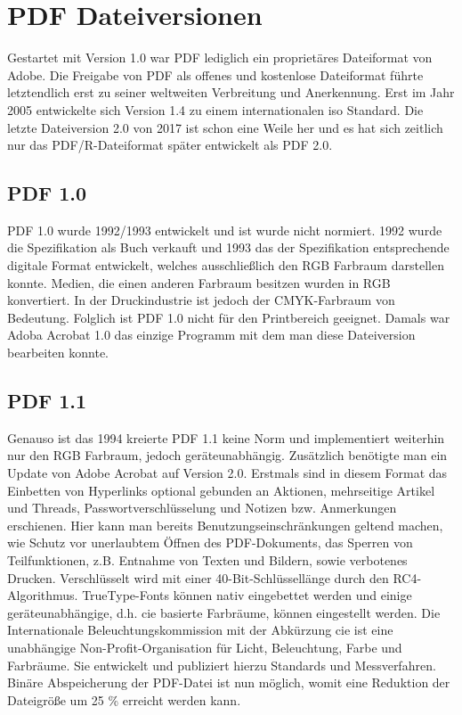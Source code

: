 \section{PDF Dateiversionen}
Gestartet mit Version 1.0 war PDF lediglich ein proprietäres Dateiformat von Adobe. Die Freigabe von PDF als offenes und kostenlose Dateiformat führte letztendlich erst zu seiner weltweiten Verbreitung und Anerkennung. Erst im Jahr 2005 entwickelte sich Version 1.4 zu einem internationalen \gls{iso} Standard. Die letzte Dateiversion 2.0 von 2017 ist schon eine Weile her und es hat sich zeitlich nur das PDF/R-Dateiformat später entwickelt als PDF 2.0.

\subsection{PDF 1.0}
PDF 1.0 wurde 1992/1993 entwickelt und ist wurde nicht normiert. 1992 wurde die Spezifikation als Buch verkauft und 1993 das der Spezifikation entsprechende digitale Format entwickelt, welches ausschließlich den RGB Farbraum darstellen konnte. Medien, die einen anderen Farbraum besitzen wurden in RGB konvertiert. In der Druckindustrie ist jedoch der CMYK-Farbraum von Bedeutung. Folglich ist PDF 1.0 nicht für den Printbereich geeignet. Damals war Adoba Acrobat 1.0 das einzige Programm mit dem man diese Dateiversion bearbeiten konnte. \cite{proj-consult}

\subsection{PDF 1.1}
Genauso ist das 1994 kreierte PDF 1.1 keine Norm und implementiert weiterhin nur den RGB Farbraum, jedoch geräteunabhängig. Zusätzlich benötigte man ein Update von Adobe Acrobat auf Version 2.0. Erstmals sind in diesem Format das Einbetten von Hyperlinks optional gebunden an Aktionen, mehrseitige Artikel und Threads, Passwortverschlüsselung und Notizen bzw. Anmerkungen erschienen. \cite{proj-consult} Hier kann man bereits Benutzungseinschränkungen geltend machen, wie Schutz vor unerlaubtem Öffnen des PDF-Dokuments, das Sperren von Teilfunktionen, z.B. Entnahme von Texten und Bildern, sowie verbotenes Drucken. Verschlüsselt wird mit einer 40-Bit-Schlüssellänge durch den RC4-Algorithmus. TrueType-Fonts können nativ eingebettet werden und einige geräteunabhängige, d.h. \gls{cie} basierte Farbräume, können eingestellt werden. \cite{schneeberger} Die Internationale Beleuchtungskommission mit der Abkürzung \gls{cie} ist eine unabhängige Non-Profit-Organisation für Licht, Beleuchtung, Farbe und Farbräume. Sie entwickelt und publiziert hierzu Standards und Messverfahren. \cite{wiki-cie-de, wiki-cie-engl}
Binäre Abspeicherung der PDF-Datei ist nun möglich, womit eine Reduktion der Dateigröße um 25 \% erreicht werden kann. \cite{schneeberger}

